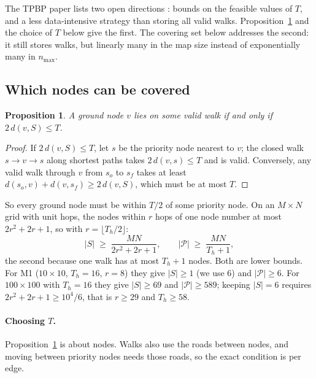 \documentclass[11pt]{article}
\theoremstyle{definition}
\theoremstyle{plain}
\newtheorem{proposition}{Proposition}
\begin{document}
The TPBP paper lists two open directions \cite{mallya2021}: bounds on the
feasible values of $T$, and a less data-intensive strategy than storing all
valid walks. Proposition~\ref{prop:cover} and the choice of $T$ below give
the first. The covering set below addresses the second: it still stores
walks, but linearly many in the map size instead of exponentially many in
$n_{\max}$.

\subsection{Which nodes can be covered}

\begin{proposition}
\label{prop:cover}
A ground node $v$ lies on some valid walk if and only if $2\, d(v, S) \leq
T$.
\end{proposition}
\begin{proof}
If $2\,d(v, S) \leq T$, let $s$ be the priority node nearest to $v$; the
closed walk $s \to v \to s$ along shortest paths takes $2\,d(v, s) \leq T$
and is valid. Conversely, any valid walk through $v$ from $s_o$ to $s_f$
takes at least $d(s_o, v) + d(v, s_f) \geq 2\, d(v, S)$, which must be at
most $T$.
\end{proof}

So every ground node must be within $T/2$ of some priority node. On an $M
\times N$ grid with unit hops, the nodes within $r$ hops of one node number
at most $2r^2 + 2r + 1$, so with $r = \lfloor T_h/2 \rfloor$:
\begin{equation}
|S| \;\geq\; \frac{MN}{2r^2 + 2r + 1}, \qquad
|\mathcal{P}| \;\geq\; \frac{MN}{T_h + 1} ,
\end{equation}
the second because one walk has at most $T_h + 1$ nodes. Both are lower
bounds. For M1 ($10 \times 10$, $T_h = 16$, $r = 8$) they give $|S| \geq 1$
(we use 6) and $|\mathcal{P}| \geq 6$. For $100 \times 100$ with $T_h =
16$ they give $|S| \geq 69$ and $|\mathcal{P}| \geq 589$; keeping $|S| = 6$
requires $2r^2 + 2r + 1 \geq 10^4 / 6$, that is $r \geq 29$ and $T_h \geq
58$.

\paragraph{Choosing $T$.} Proposition~\ref{prop:cover} is about nodes.
Walks also use the roads between nodes, and moving between priority nodes
needs those roads, so the exact condition is per edge.
\end{document}
